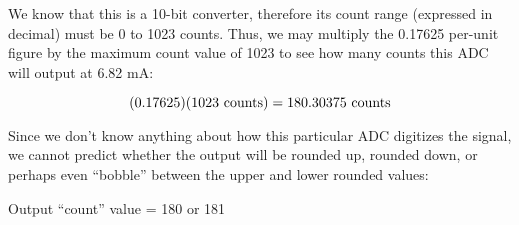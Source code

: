 We know that this is a 10-bit converter, therefore its count range (expressed in decimal) must be 0 to 1023 counts.  Thus, we may multiply the 0.17625 per-unit figure by the maximum count value of 1023 to see how many counts this ADC will output at 6.82 mA:

\vskip 10pt

$$(0.17625)(1023 \hbox{ counts}) = 180.30375 \hbox{ counts}$$

\vskip 10pt

Since we don't know anything about how this particular ADC digitizes the signal, we cannot predict whether the output will be rounded up, rounded down, or perhaps even ``bobble'' between the upper and lower rounded values:

\vskip 10pt

Output ``count'' value = 180 or 181





